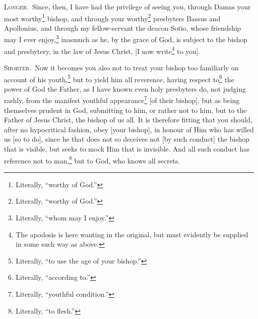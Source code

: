 \textsc{Longer.}~Since, then, I have had the privilege of seeing you, through Damas your most worthy\footnote{Literally, “worthy of God.”} bishop, and through your worthy\footnote{Literally, “worthy of God.”} presbyters Bassus and Apollonius, and through my fellow-servant the deacon Sotio, whose friendship may I ever enjoy,\footnote{Literally, “whom may I enjoy.”} inasmuch as he, by the grace of God, is subject to the bishop and presbytery, in the law of Jesus Christ, [I now write\footnote{The apodosis is here wanting in the original, but must evidently be supplied in some such way as above.} to you].


\textsc{Shorter.}~Now it becomes you also not to treat your bishop too familiarly on account of his youth,\footnote{Literally, “to use the age of your bishop.”} but to yield him all reverence, having respect to\footnote{Literally, “according to.”} the power of God the Father, as I have known even holy presbyters do, not judging rashly, from the manifest youthful appearance\footnote{Literally, “youthful condition.”} [of their bishop], but as being themselves prudent in God, submitting to him, or rather not to him, but to the Father of Jesus Christ, the bishop of us all. It is therefore fitting that you should, after no hypocritical fashion, obey [your bishop], in honour of Him who has willed us [so to do], since he that does not so deceives not [by such conduct] the bishop that is visible, but seeks to mock Him that is invisible. And all such conduct has reference not to man,\footnote{Literally, “to flesh.”} but to God, who knows all secrets.


